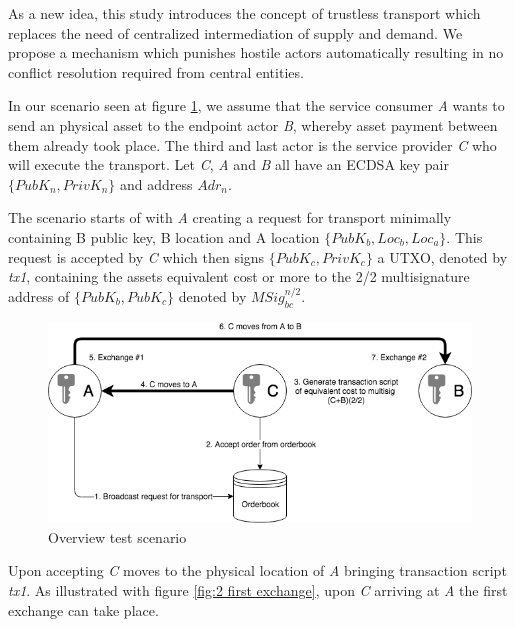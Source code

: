 As a new idea, this study introduces the concept of trustless transport which replaces the need of centralized intermediation of supply and demand. We propose a mechanism which punishes hostile actors automatically resulting in no conflict resolution required from central entities. \par
In our scenario seen at figure \ref{fig:1 main overview}, we assume that the service consumer \textit{A} wants to send an physical asset to the endpoint actor \textit{B}, whereby asset payment between them already took place. The third and last actor is the service provider \textit{C} who will execute the transport. Let \textit{C}, \textit{A} and \textit{B} all have an ECDSA key pair \(\{PubK_n, PrivK_n\}\) and address \(Adr_n\). \par
The scenario starts of with \textit{A} creating a request for transport minimally containing B public key, B location and A location \(\{PubK_b, Loc_b, Loc_a\}\). This request is accepted by \textit{C} which then signs \(\{PubK_c, PrivK_c\}\) a UTXO, denoted by \textit{tx1}, containing the assets equivalent cost or more to the 2/2 multisignature address of \(\{PubK_b, PubK_c\}\) denoted by \(MSig_{bc}^{n/2}\). \par

\begin{figure}[h]
\centering
\includegraphics[width=1\textwidth]{images/main.png}
\caption{Overview test scenario}
\label{fig:1 main overview}
\end{figure}

Upon accepting \textit{C} moves to the physical location of \textit{A} bringing transaction script \textit{tx1}. As illustrated with figure \ref{fig:2 first exchange}, upon \textit{C} arriving at \textit{A} the first exchange can take place. \par

